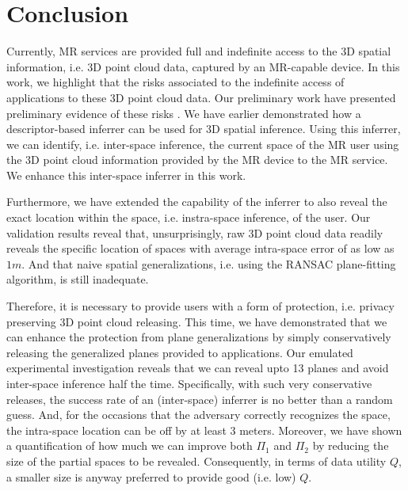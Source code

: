 \section{Conclusion}\label{sec:conclusion}
Currently, MR services are provided full and indefinite access to the 3D spatial information, i.e. 3D point cloud data, captured by an MR-capable device. In this work, we highlight that the risks associated to the indefinite access of applications to these 3D point cloud data. Our preliminary work have presented preliminary evidence of these risks \cite{deguzman2019firstlook}. We have earlier demonstrated how a descriptor-based inferrer can be used for 3D spatial inference. Using this inferrer, we can identify, i.e. inter-space inference, the current space of the MR user using the 3D point cloud information provided by the MR device to the MR service. We enhance this inter-space inferrer in this work.

Furthermore, we have extended the capability of the inferrer to also reveal the exact location within the space, i.e. instra-space inference, of the user. Our validation results reveal that, unsurprisingly, raw 3D point cloud data readily reveals the specific location of spaces with average intra-space error of as low as $1 m$. And that naive spatial generalizations, i.e. using the RANSAC plane-fitting algorithm, is still inadequate.%

Therefore, it is necessary to provide users with a form of protection, i.e. privacy preserving 3D point cloud releasing. %
This time, we have demonstrated that we can enhance the protection from plane generalizations by simply conservatively releasing the generalized planes provided to applications. Our emulated experimental investigation reveals that we can reveal upto 13 planes and avoid inter-space inference half the time. Specifically, with such very conservative releases, the success rate of an (inter-space) inferrer is no better than a random guess. And, for the occasions that the adversary correctly recognizes the space, the intra-space location can be off by at least 3 meters. Moreover, we have shown a quantification of how much we can improve both $\Pi_1$ and $\Pi_2$ by reducing the size of the partial spaces to be revealed. Consequently, in terms of data utility $Q$, a smaller size is anyway preferred to provide good (i.e. low) $Q$. %


